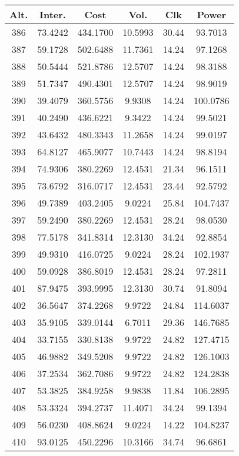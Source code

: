 \begin{center}
\begin{footnotesize}
\begin{tabular}{|c|ccccc|}
\hline
Alt. & Inter. & Cost & Vol. & Clk & Power\\
\hline
386 & 73.4242 & 434.1700 & 10.5993 & 30.44 & 93.7013 \\
387 & 59.1728 & 502.6488 & 11.7361 & 14.24 & 97.1268 \\
388 & 50.5444 & 521.8786 & 12.5707 & 14.24 & 98.3188 \\
389 & 51.7347 & 490.4301 & 12.5707 & 14.24 & 98.9019 \\
390 & 39.4079 & 360.5756 & 9.9308 & 14.24 & 100.0786 \\
391 & 40.2490 & 436.6221 & 9.3422 & 14.24 & 99.5021 \\
392 & 43.6432 & 480.3343 & 11.2658 & 14.24 & 99.0197 \\
393 & 64.8127 & 465.9077 & 10.7443 & 14.24 & 98.8194 \\
394 & 74.9306 & 380.2269 & 12.4531 & 21.34 & 96.1511 \\
395 & 73.6792 & 316.0717 & 12.4531 & 23.44 & 92.5792 \\
396 & 49.7389 & 403.2405 & 9.0224 & 25.84 & 104.7437 \\
397 & 59.2490 & 380.2269 & 12.4531 & 28.24 & 98.0530 \\
398 & 77.5178 & 341.8314 & 12.3130 & 34.24 & 92.8854 \\
399 & 49.9310 & 416.0725 & 9.0224 & 28.24 & 102.1937 \\
400 & 59.0928 & 386.8019 & 12.4531 & 28.24 & 97.2811 \\
401 & 87.9475 & 393.9995 & 12.3130 & 30.74 & 91.8094 \\
402 & 36.5647 & 374.2268 & 9.9722 & 24.84 & 114.6037 \\
403 & 35.9105 & 339.0144 & 6.7011 & 29.36 & 146.7685 \\
404 & 33.7155 & 330.8138 & 9.9722 & 24.82 & 127.4715 \\
405 & 46.9882 & 349.5208 & 9.9722 & 24.82 & 126.1003 \\
406 & 37.2534 & 362.7086 & 9.9722 & 24.82 & 124.2838 \\
407 & 53.3825 & 384.9258 & 9.9838 & 11.84 & 106.2895 \\
408 & 53.3324 & 394.2737 & 11.4071 & 34.24 & 99.1394 \\
409 & 56.0230 & 408.8624 & 9.0224 & 14.22 & 104.8237 \\
410 & 93.0125 & 450.2296 & 10.3166 & 34.74 & 96.6861 \\

\end{tabular}
\end{footnotesize}
\end{center}
